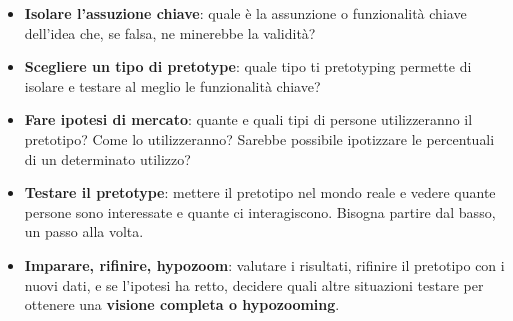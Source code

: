 \documentclass[a4paper,11pt,oneside]{book}
\begin{document}
\begin{itemize}
	\item \textbf{Isolare l'assuzione chiave}: quale è la assunzione o funzionalità chiave dell'idea che, se falsa, ne minerebbe la validità?
	\item \textbf{Scegliere un tipo di pretotype}: quale tipo ti pretotyping permette di isolare e testare al meglio le funzionalità chiave?
	\item \textbf{Fare ipotesi di mercato}: quante e quali tipi di persone utilizzeranno il pretotipo? Come lo utilizzeranno? Sarebbe possibile ipotizzare le percentuali di un determinato utilizzo?
	\item \textbf{Testare il pretotype}: mettere il pretotipo nel mondo reale e vedere quante persone sono interessate e quante ci interagiscono. Bisogna partire dal basso, un passo alla volta.
	\item \textbf{Imparare, rifinire, hypozoom}: valutare i risultati, rifinire il pretotipo con i nuovi dati, e se l'ipotesi ha retto, decidere quali altre situazioni testare per ottenere una \textbf{visione completa o hypozooming}.
\end{itemize}

\pagebreak
\end{document}
